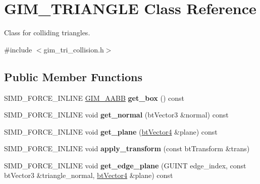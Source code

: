 \hypertarget{class_g_i_m___t_r_i_a_n_g_l_e}{\section{G\+I\+M\+\_\+\+T\+R\+I\+A\+N\+G\+L\+E Class Reference}
\label{class_g_i_m___t_r_i_a_n_g_l_e}
}


Class for colliding triangles.  




{\ttfamily \#include $<$gim\+\_\+tri\+\_\+collision.\+h$>$}

\subsection*{Public Member Functions}
\begin{DoxyCompactItemize}
\item 
\hypertarget{class_g_i_m___t_r_i_a_n_g_l_e_ac2b7d2a1fd46d21af1d5b5159c92e12f}{S\+I\+M\+D\+\_\+\+F\+O\+R\+C\+E\+\_\+\+I\+N\+L\+I\+N\+E \hyperlink{class_g_i_m___a_a_b_b}{G\+I\+M\+\_\+\+A\+A\+B\+B} {\bfseries get\+\_\+box} () const }\label{class_g_i_m___t_r_i_a_n_g_l_e_ac2b7d2a1fd46d21af1d5b5159c92e12f}

\item 
\hypertarget{class_g_i_m___t_r_i_a_n_g_l_e_acaaf015115216db37af901e4bbf67773}{S\+I\+M\+D\+\_\+\+F\+O\+R\+C\+E\+\_\+\+I\+N\+L\+I\+N\+E void {\bfseries get\+\_\+normal} (bt\+Vector3 \&normal) const }\label{class_g_i_m___t_r_i_a_n_g_l_e_acaaf015115216db37af901e4bbf67773}

\item 
\hypertarget{class_g_i_m___t_r_i_a_n_g_l_e_a4f6af6f6c372d2fce363d6c55f8b746c}{S\+I\+M\+D\+\_\+\+F\+O\+R\+C\+E\+\_\+\+I\+N\+L\+I\+N\+E void {\bfseries get\+\_\+plane} (\hyperlink{classbt_vector4}{bt\+Vector4} \&plane) const }\label{class_g_i_m___t_r_i_a_n_g_l_e_a4f6af6f6c372d2fce363d6c55f8b746c}

\item 
\hypertarget{class_g_i_m___t_r_i_a_n_g_l_e_ab118892e21f9683a91207072ada1d179}{S\+I\+M\+D\+\_\+\+F\+O\+R\+C\+E\+\_\+\+I\+N\+L\+I\+N\+E void {\bfseries apply\+\_\+transform} (const bt\+Transform \&trans)}\label{class_g_i_m___t_r_i_a_n_g_l_e_ab118892e21f9683a91207072ada1d179}

\item 
\hypertarget{class_g_i_m___t_r_i_a_n_g_l_e_a8190bf70496dc7743ce2406250eec6e7}{S\+I\+M\+D\+\_\+\+F\+O\+R\+C\+E\+\_\+\+I\+N\+L\+I\+N\+E void {\bfseries get\+\_\+edge\+\_\+plane} (G\+U\+I\+N\+T edge\+\_\+index, const bt\+Vector3 \&triangle\+\_\+normal, \hyperlink{classbt_vector4}{bt\+Vector4} \&plane) const }\label{class_g_i_m___t_r_i_a_n_g_l_e_a8190bf70496dc7743ce2406250eec6e7}


\end{DoxyCompactItemize}
